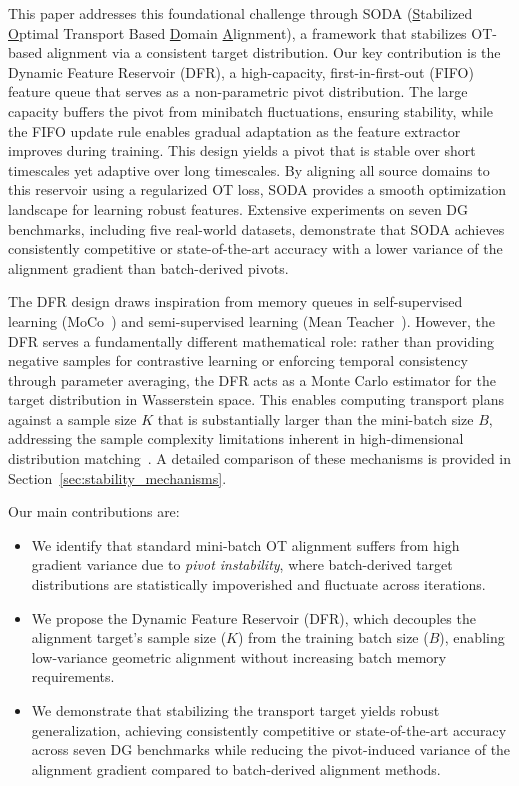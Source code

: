 \begin{sloppypar} 
This paper addresses this foundational challenge through SODA (\underline{S}tabilized \underline{O}ptimal Transport Based \underline{D}omain \underline{A}lignment), a framework that stabilizes OT-based alignment via a consistent target distribution. Our key contribution is the Dynamic Feature Reservoir (DFR), a high-capacity, first-in-first-out (FIFO) feature queue that serves as a non-parametric pivot distribution. The large capacity buffers the pivot from minibatch fluctuations, ensuring stability, while the FIFO update rule enables gradual adaptation as the feature extractor improves during training. This design yields a pivot that is stable over short timescales yet adaptive over long timescales. By aligning all source domains to this reservoir using a regularized OT loss, SODA provides a smooth optimization landscape for learning robust features. Extensive experiments on seven DG benchmarks, including five real-world datasets, demonstrate that SODA achieves consistently competitive or state-of-the-art accuracy with a lower variance of the alignment gradient than batch-derived pivots.
\end{sloppypar} 

The DFR design draws inspiration from memory queues in self-supervised learning (MoCo~\citep{he2020momentum}) and semi-supervised learning (Mean Teacher~\citep{tarvainen2017mean}). However, the DFR serves a fundamentally different mathematical role: rather than providing negative samples for contrastive learning or enforcing temporal consistency through parameter averaging, the DFR acts as a Monte Carlo estimator for the target distribution in Wasserstein space. This enables computing transport plans against a sample size $K$ that is substantially larger than the mini-batch size $B$, addressing the sample complexity limitations inherent in high-dimensional distribution matching~\citep{dong2020how}. A detailed comparison of these mechanisms is provided in Section~\ref{sec:stability_mechanisms}.

Our main contributions are:
\begin{itemize}
    \item We identify that standard mini-batch OT alignment suffers from high gradient variance due to \textit{pivot instability}, where batch-derived target distributions are statistically impoverished and fluctuate across iterations.
    \item We propose the Dynamic Feature Reservoir (DFR), which decouples the alignment target's sample size ($K$) from the training batch size ($B$), enabling low-variance geometric alignment without increasing batch memory requirements.
    \item We demonstrate that stabilizing the transport target yields robust generalization, achieving consistently competitive or state-of-the-art accuracy across seven DG benchmarks while reducing the pivot-induced variance of the alignment gradient compared to batch-derived alignment methods.
\end{itemize}